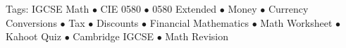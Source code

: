 \documentclass[11pt,a4paper]{article}
\begin{document}
\vspace{14pt}
\begin{center}
  \sffamily\scriptsize\textcolor{textmuted}{
    Tags: IGCSE Math $\bullet$ CIE 0580 $\bullet$ 0580 Extended $\bullet$ Money $\bullet$ Currency Conversions $\bullet$ Tax $\bullet$ Discounts $\bullet$ Financial Mathematics $\bullet$ Math Worksheet $\bullet$ Kahoot Quiz $\bullet$ Cambridge IGCSE $\bullet$ Math Revision
  }
\end{center}
\end{document}
